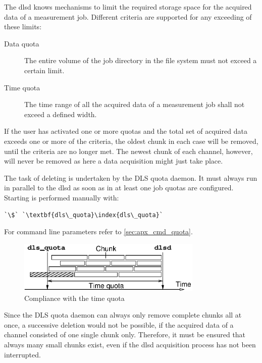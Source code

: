 \documentclass[a4paper,12pt,BCOR6mm,bibtotoc,idxtotoc]{scrbook}
\begin{document}
The dlsd knows mechanisms to limit the required storage space for the acquired
data of a measurement job. Different criteria are supported for any exceeding
of these limits:

\begin{description}

\item[Data quota] The entire volume of the job directory in the file system
must not exceed a certain limit.

\item[Time quota] The time range of all the acquired data of a measurement job
shall not exceed a defined width.

\end{description}

If the user has activated one or more quotas and the total set of acquired
data exceeds one or more of the criteria, the oldest chunk in
each case will be removed, until the criteria are no longer met. The newest
chunk of each channel, however, will never be removed as here a data
acquisition might just take place.

The task of deleting is undertaken by the DLS quota daemon. It must always run
in parallel to the dlsd as soon as in at least one job quotas are configured.
Starting is performed manually with:

\begin{lstlisting}
`\$` `\textbf{dls\_quota}\index{dls\_quota}`
\end{lstlisting}

For command line parameters refer to \autoref{sec:apx_cmd_quota}.

\begin{figure}[htb]
 \begin{center}
  \includegraphics[width=250pt]{bilder/quota_en}
 \end{center}
 \caption{Compliance with the time quota}
 \label{fig:quota}
\end{figure}

Since the DLS quota daemon can always only remove complete chunks
all at once, a successive deletion would not be possible, if the acquired data
of a channel consisted of one single chunk only. Therefore, it must be ensured
that always many small chunks exist, even if the dlsd acquisition process has
not been interrupted.
\end{document}

